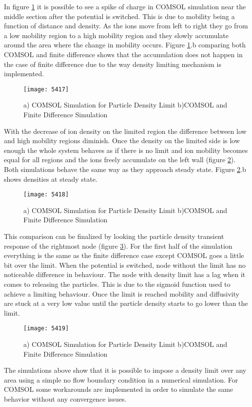 \begin{doublespace}
In figure \ref{5417} it is possible to see a spike of charge in COMSOL simulation near the middle section after the potential is switched. This is due to mobility being a function of distance and density. As the ions move from left to right they go from a low mobility region to a high mobility region and they slowly accumulate around the area where the change in mobility occurs. Figure \ref{5417}.b comparing both COMSOL and finite difference shows that the accumulation does not happen in the case of finite difference due to the way density limiting mechanism is implemented.

\begin{figure}[!htp]
\centering
\texttt{[image: 5417]}
\caption{ a) COMSOL Simulation for Particle Density Limit b)COMSOL and Finite Difference Simulation} 
\label{5417}
\end{figure}

With the decrease of ion density on the limited region the difference between low and high mobility regions diminish. Once the density on the limited side is low enough the whole system behaves as if there is no limit and ion mobility becomes equal for all regions and the ions freely accumulate on the left wall (figure \ref{5418}). Both simulations behave the same way as they approach steady state. Figure \ref{5418}.b shows densities at steady state.

\begin{figure}[!htp]
\centering
\texttt{[image: 5418]}
\caption{ a) COMSOL Simulation for Particle Density Limit b)COMSOL and Finite Difference Simulation} 
\label{5418}
\end{figure}

This comparison can be finalized by looking the particle density transient response of the rightmost node (figure \ref{5419}). For the first half of the simulation everything is the same as the finite difference case except COMSOL goes a little bit over the limit. When the potential is switched, node without the limit has no noticeable difference in behaviour. The node with density limit has a lag when it comes to releasing the particles. This is due to the sigmoid function used to achieve a limiting behaviour. Once the limit is reached mobility and diffusivity are stuck at a very low value until the particle density starts to go lower than the limit.

\begin{figure}[!htp]
\centering
\texttt{[image: 5419]}
\caption{ a) COMSOL Simulation for Particle Density Limit b)COMSOL and Finite Difference Simulation} 
\label{5419}
\end{figure}

The simulations above show that it is possible to impose a density limit over any area using a simple no flow boundary condition in a numerical simulation. For COMSOL some workarounds are implemented in order to simulate the same behavior without any convergence issues. 


\end{doublespace}